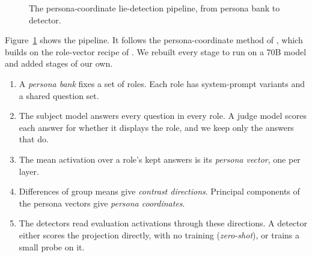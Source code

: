 \begin{figure}[t]
\centering
{}
\caption{The persona-coordinate lie-detection pipeline, from persona bank to detector.}
\label{fig:m-pipeline}
\end{figure}

Figure~\ref{fig:m-pipeline} shows the pipeline. It follows the persona-coordinate method of \textcite[p.~3]{mahadik2026persona}, which builds on the role-vector recipe of \textcite[p.~3]{lu2026assistant}. We rebuilt every stage to run on a 70B model and added stages of our own. %

\begin{enumerate}
\item A \emph{persona bank} fixes a set of roles. Each role has system-prompt variants and a shared question set.
\item The subject model answers every question in every role. A judge model scores each answer for whether it displays the role, and we keep only the answers that do.
\item The mean activation over a role's kept answers is its \emph{persona vector}, one per layer.
\item Differences of group means give \emph{contrast directions}. Principal components of the persona vectors give \emph{persona coordinates}.
\item The detectors read evaluation activations through these directions. A detector either scores the projection directly, with no training (\emph{zero-shot}), or trains a small probe on it.
\end{enumerate}

